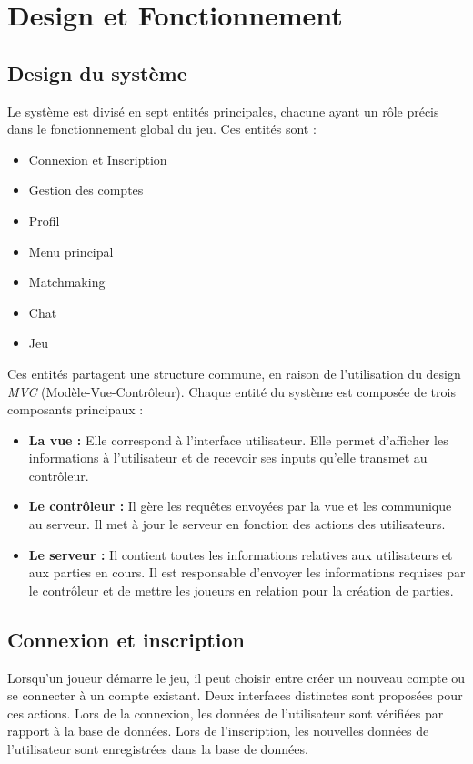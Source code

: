 \documentclass{report}
\begin{document}
\chapter{Design et Fonctionnement}
\label{chap:design}

\section*{Design du système}

\noindent Le système est divisé en sept entités principales, chacune ayant un rôle précis dans le fonctionnement global du jeu. Ces entités sont :  
\begin{itemize}
    \item Connexion et Inscription
    \item Gestion des comptes
    \item Profil
    \item Menu principal
    \item Matchmaking
    \item Chat
    \item Jeu
\end{itemize}

\noindent Ces entités partagent une structure commune, en raison de l'utilisation du design \emph{MVC} (Modèle-Vue-Contrôleur). Chaque entité du système est composée de trois composants principaux :  
\begin{itemize}
    \item \textbf{La vue :} Elle correspond à l'interface utilisateur. Elle permet d'afficher les informations à l'utilisateur et de recevoir ses inputs qu'elle transmet au contrôleur.  
    \item \textbf{Le contrôleur :} Il gère les requêtes envoyées par la vue et les communique au serveur. Il met à jour le serveur en fonction des actions des utilisateurs.  
    \item \textbf{Le serveur :} Il contient toutes les informations relatives aux utilisateurs et aux parties en cours. Il est responsable d'envoyer les informations requises par le contrôleur et de mettre les joueurs en relation pour la création de parties.
\end{itemize}

\section{Connexion et inscription}

\noindent Lorsqu'un joueur démarre le jeu, il peut choisir entre créer un nouveau compte ou se connecter à un compte existant. Deux interfaces distinctes sont proposées pour ces actions. Lors de la connexion, les données de l'utilisateur sont vérifiées par rapport à la base de données. Lors de l'inscription, les nouvelles données de l'utilisateur sont enregistrées dans la base de données.
\end{document}
